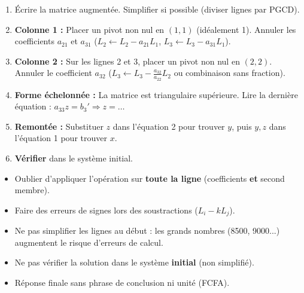 \documentclass[11pt]{article}
\begin{document}
\begin{methode}
\begin{enumerate}
    \item Écrire la matrice augmentée. Simplifier si possible (diviser lignes par PGCD).
    \item \textbf{Colonne 1 :} Placer un pivot non nul en $(1,1)$ (idéalement 1). Annuler les coefficients $a_{21}$ et $a_{31}$ ($L_2 \leftarrow L_2 - a_{21}L_1$, $L_3 \leftarrow L_3 - a_{31}L_1$).
    \item \textbf{Colonne 2 :} Sur les lignes 2 et 3, placer un pivot non nul en $(2,2)$. Annuler le coefficient $a_{32}$ ($L_3 \leftarrow L_3 - \frac{a_{32}}{a_{22}}L_2$ ou combinaison sans fraction).
    \item \textbf{Forme échelonnée :} La matrice est triangulaire supérieure. Lire la dernière équation : $a_{33}z = b_3' \Rightarrow z = \dots$
    \item \textbf{Remontée :} Substituer $z$ dans l'équation 2 pour trouver $y$, puis $y,z$ dans l'équation 1 pour trouver $x$.
    \item \textbf{Vérifier} dans le système initial.
\end{enumerate}
\end{methode}

\begin{attention}
\begin{itemize}
    \item Oublier d'appliquer l'opération sur \textbf{toute la ligne} (coefficients \textbf{et} second membre).
    \item Faire des erreurs de signes lors des soustractions ($L_i - kL_j$).
    \item Ne pas simplifier les lignes au début : les grands nombres (8500, 9000...) augmentent le risque d'erreurs de calcul.
    \item Ne pas vérifier la solution dans le système \textbf{initial} (non simplifié).
    \item Réponse finale sans phrase de conclusion ni unité (FCFA).
\end{itemize}
\end{attention}
\end{document}
